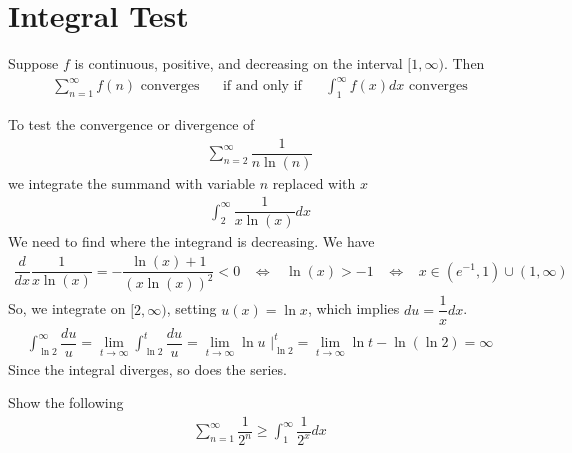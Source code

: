 \section{Integral Test}

\begin{theorem}
Suppose $f$ is continuous, positive, and decreasing on the interval $[1, \infty)$. Then
\begin{align*}
    \sum_{n=1}^{\infty} f(n) \hspace{4pt} \text{converges} \hspace{20pt} \text{if and only if} \hspace{20pt} \int_{1}^{\infty} f(x) dx \hspace{4pt} \text{converges}
\end{align*}
\end{theorem}

\begin{example}
To test the convergence or divergence of 
\begin{align*}
    \sum_{n=2}^{\infty} \dfrac{1}{n \ln (n)}
\end{align*}
we integrate the summand with variable $n$ replaced with $x$
\begin{align*}
    \int_{2}^{\infty} \dfrac{1}{x \ln (x)} dx 
\end{align*}
We need to find where the integrand is decreasing. We have
\begin{align*}
    \dfrac{d}{dx} \dfrac{1}{x \ln (x)} = -\dfrac{\ln (x) + 1}{(x \ln (x))^{2}} < 0 \hspace{10pt} \Longleftrightarrow \hspace{10pt} \ln (x) > -1 \hspace{10pt} \Longleftrightarrow \hspace{10pt} x \in (e^{-1}, 1) \cup (1, \infty)
\end{align*}
So, we integrate on $[2, \infty)$, setting $u(x) = \ln x$, which implies $du = \dfrac{1}{x} dx$.
\begin{align*}
    \int_{\ln 2}^{\infty} \dfrac{du}{u} = \lim_{t \longrightarrow \infty} \int_{\ln 2}^{t} \dfrac{du}{u} = \lim_{t \longrightarrow \infty} \ln u \hspace{4pt} \Big|_{\ln 2}^{t} = \lim_{t \longrightarrow \infty} \ln t - \ln(\ln 2) = \infty
\end{align*}
Since the integral diverges, so does the series.
\end{example}

\begin{exercise}
Show the following
\begin{align*}
    \sum_{n=1}^{\infty} \dfrac{1}{2^{n}} \geq \int_{1}^{\infty} \dfrac{1}{2^{x}} dx
\end{align*}
\end{exercise}

